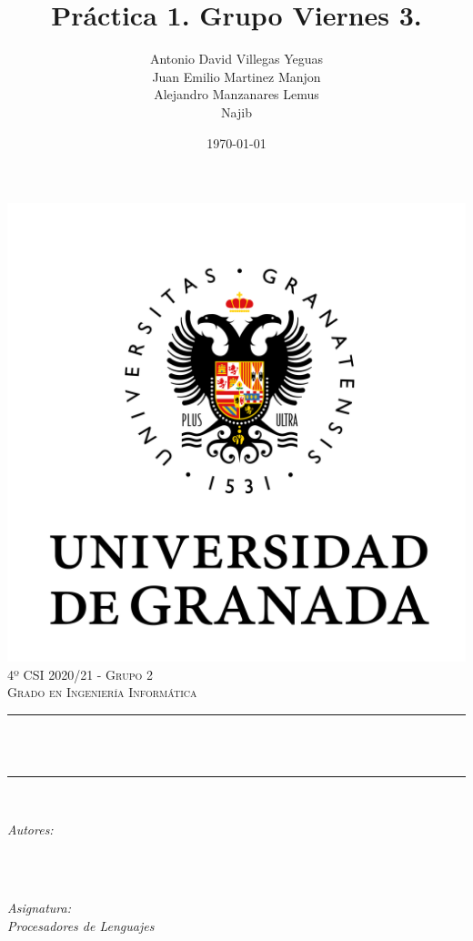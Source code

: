 \documentclass[12pt, spanish]{article}
\title{Práctica 1. Grupo Viernes 3.\\
  \hspace{0.05cm} }
\author{Antonio David Villegas Yeguas\\
		Juan Emilio Martinez Manjon\\
		Alejandro Manzanares Lemus\\
		Najib}
\date{\today}
\makeatletter
\let\thetitle\@title
\let\theauthor\@author
\makeatother
\begin{document}

\begin{titlepage}
    \centering
    \vspace*{0.3 cm}
    \includegraphics[scale = 0.50]{ugr.png}\\[0.7 cm]
    \textsc{\large 4º CSI 2020/21 - Grupo 2}\\[0.5 cm]
    \textsc{\large Grado en Ingeniería Informática}\\[0.5 cm]
    \rule{\linewidth}{0.2 mm} \\[0.2 cm]
    { \huge \bfseries \thetitle}\\
    \rule{\linewidth}{0.2 mm} \\[1 cm]

    \begin{minipage}{0.4\textwidth}
        \begin{flushleft} \large
            \emph{Autores:}\\
            \theauthor\\
            \end{flushleft}
            \end{minipage}~
            \begin{minipage}{0.4\textwidth}
            \begin{flushright} \large
            \emph{Asignatura: \\
            Procesadores de Lenguajes}   \\


\end{flushright}
\end{minipage}
\end{titlepage}
\end{document}

